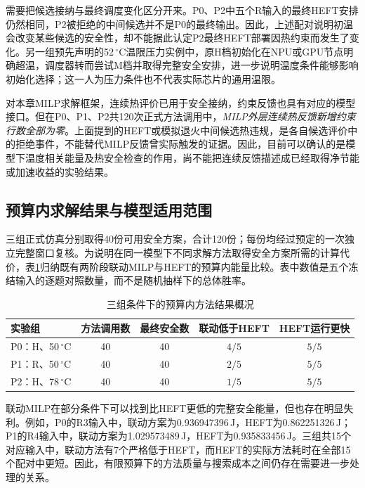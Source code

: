 需要把候选接纳与最终调度变化区分开来。P0、P2中五个R输入的最终HEFT安排仍然相同，P2被拒绝的中间候选并不是P0的最终输出。因此，上述配对说明初温会改变某些候选的安全性，却不能据此认定P2最终HEFT部署因热约束而发生了变化。另一组预先声明的52\,$^\circ$C温限压力实例中，原H档初始化在NPU或GPU节点明确超温，调度器转而尝试M档并取得完整安全安排，进一步说明温度条件能够影响初始化选择；这一人为压力条件也不代表实际芯片的通用温限。

对本章MILP求解框架，连续热评价已用于安全接纳，约束反馈也具有对应的模型接口。但在P0、P1、P2共120次正式方法调用中，\emph{MILP外层连续热反馈新增约束行数全部为零}。上面提到的HEFT或模拟退火中间候选热违规，是各自候选评价中的拒绝事件，不能替代MILP反馈曾实际触发的证据。因此，目前可以确认的是模型下温度相关能量及热安全检查的作用，尚不能把连续反馈描述成已经取得净节能或加速收益的实验结果。


\subsection{预算内求解结果与模型适用范围}

三组正式仿真分别取得40份可用安全方案，合计120份；每份均经过预定的一次独立完整窗口复核。为说明在同一模型下不同求解方法取得安全方案所需的计算代价，表\ref{tab:c3-budget}归纳既有两阶段联动MILP与HEFT的预算内能量比较。表中数值是五个冻结输入的逐题对照数量，而不是随机抽样下的总体胜率。

\begin{table}[htbp]
 \centering
 \caption{三组条件下的预算内方法结果概况}
 \label{tab:c3-budget}
 \begin{tabular}{lcccc}
 \toprule
 实验组 & 方法调用数 & 最终安全数 & 联动低于HEFT & HEFT运行更快\\
 \midrule
 P0：H、50\,$^\circ$C & 40 & 40 & $4/5$ & $5/5$\\
 P1：R、50\,$^\circ$C & 40 & 40 & $2/5$ & $5/5$\\
 P2：H、78\,$^\circ$C & 40 & 40 & $1/5$ & $5/5$\\
 \bottomrule
 \end{tabular}
\end{table}

联动MILP在部分条件下可以找到比HEFT更低的完整安全能量，但也存在明显失利。例如，P0的R3输入中，联动方案为0.936947396\,J，HEFT为0.862251326\,J；P1的R4输入中，联动方案为1.029573489\,J，HEFT为0.935833456\,J。三组共15个对应输入中，联动方法有7个严格低于HEFT，而HEFT的实际方法耗时在全部15个配对中更短。因此，有限预算下的方法质量与搜索成本之间仍存在需要进一步处理的关系。

